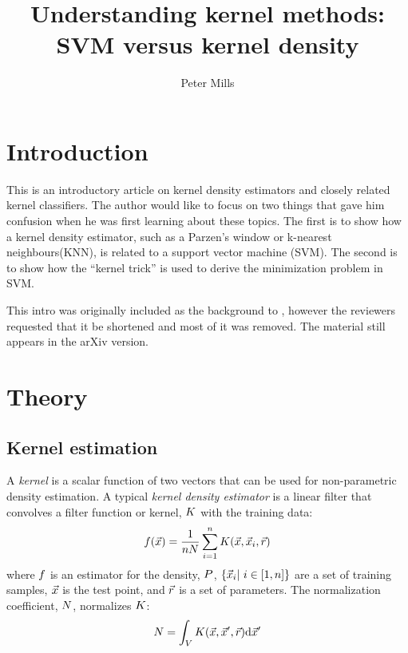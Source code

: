 \documentclass{article}
\newenvironment{eqnnon}{\begin{equation*}}{\end{equation*}}
\begin{document}
\title{Understanding kernel methods: SVM versus kernel density}

\author{Peter Mills}

\maketitle

\tableofcontents

\section{Introduction}

This is an introductory article on kernel density estimators and closely
related kernel classifiers.
The author would like to focus on two things that gave him confusion when he was
first learning about these topics.
The first is to show how a kernel density estimator, 
such as a Parzen's window or k-nearest neighbours(KNN),
is related to a support vector machine (SVM).
The second is to show how the ``kernel trick'' is used to derive the
minimization problem in SVM.

This intro was originally included as the background to \citet{Mills2018},
however the reviewers requested that it be shortened and most of it was
removed.
The material still appears in the arXiv version.

\section{Theory}

\label{theory}

\subsection{Kernel estimation}

A {\it kernel} is a scalar function of two vectors that can be used for 
non-parametric density estimation. A typical {\it kernel density estimator}
is a linear filter that convolves a filter function or kernel,
$K$ with the training data:
\begin{eqnnon}
	\densityestimator(\testpoint) = \frac {1}{\nsample \norm} \sum_{i=1}^\nsample \vectorkernel(\testpoint, \sample_i, \kernelparam)
	\label{kernel_estimator}
\end{eqnnon}
where $f$ is an estimator for the density, $P$,
$\lbrace \vec {x}_i | ~ i \in [1,n] \rbrace$ are a set of training samples, 
$\vec {x}$ is the test point,
and $\vec r$ is a set of parameters. 
The normalization coefficient, $N$, normalizes $K$:
\begin{eqnnon}
	\norm = \int_V \vectorkernel(\point, \point^\prime, \kernelparam) \mathrm d \point^\prime
	\label{norm_def}
\end{eqnnon}
\end{document}
